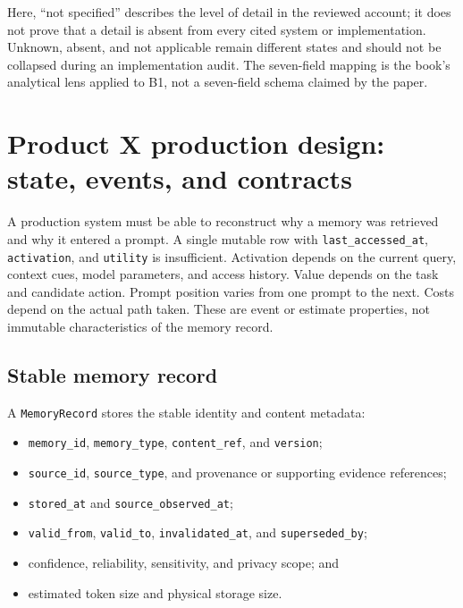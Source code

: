 Here, ``not specified'' describes the level of detail in the reviewed account; it does not prove that a detail is absent from every cited system or implementation. Unknown, absent, and not applicable remain different states and should not be collapsed during an implementation audit. The seven-field mapping is the book's analytical lens applied to B1, not a seven-field schema claimed by the paper.


\section{Product X production design: state, events, and contracts}
\label{sec:ch12-production-design}

A production system must be able to reconstruct why a memory was retrieved and why it entered a prompt. A single mutable row with \texttt{last\_accessed\_at}, \texttt{activation}, and \texttt{utility} is insufficient. Activation depends on the current query, context cues, model parameters, and access history. Value depends on the task and candidate action. Prompt position varies from one prompt to the next. Costs depend on the actual path taken. These are event or estimate properties, not immutable characteristics of the memory record.

\subsection{Stable memory record}
\label{subsec:ch12-memory-record}

A \texttt{MemoryRecord} stores the stable identity and content metadata:

\begin{itemize}
  \item \texttt{memory\_id}, \texttt{memory\_type}, \texttt{content\_ref}, and \texttt{version};
  \item \texttt{source\_id}, \texttt{source\_type}, and provenance or supporting evidence references;
  \item \texttt{stored\_at} and \texttt{source\_observed\_at};
  \item \texttt{valid\_from}, \texttt{valid\_to}, \texttt{invalidated\_at}, and \texttt{superseded\_by};
  \item confidence, reliability, sensitivity, and privacy scope; and
  \item estimated token size and physical storage size.
\end{itemize}


